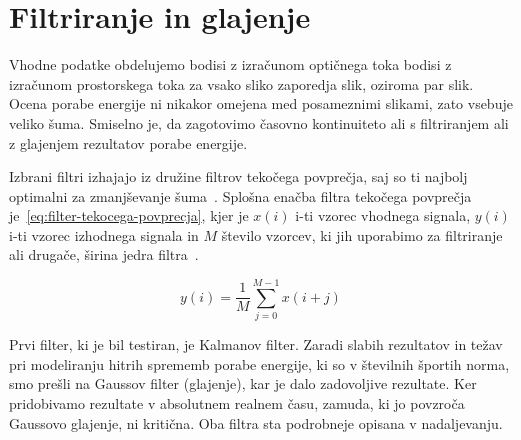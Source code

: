 \section{Filtriranje in glajenje}\label{sec:filtri}
Vhodne podatke obdelujemo bodisi z izračunom optičnega toka bodisi z izračunom prostorskega toka za vsako sliko zaporedja slik, oziroma par slik. Ocena porabe energije ni nikakor omejena med posameznimi slikami, zato vsebuje veliko šuma. Smiselno je, da zagotovimo časovno kontinuiteto ali s filtriranjem ali z glajenjem rezultatov porabe energije.

Izbrani filtri izhajajo iz družine filtrov tekočega povprečja, saj so ti najbolj optimalni za zmanjševanje šuma~\cite{smith1997scientist}. Splošna enačba filtra tekočega povprečja je~\eqref{eq:filter-tekocega-povprecja}, kjer je $x(i)$ i-ti vzorec vhodnega signala, $y(i)$ i-ti vzorec izhodnega signala in $M$ število vzorcev, ki jih uporabimo za filtriranje ali drugače, širina jedra filtra~\cite{smith1997scientist}.

\begin{equation}
y(i) = \frac{1}{M} \sum_{j=0}^{M-1} x(i + j)
\label{eq:filter-tekocega-povprecja}
\end{equation}

Prvi filter, ki je bil testiran, je Kalmanov filter. Zaradi slabih rezultatov in težav pri modeliranju hitrih sprememb porabe energije, ki so v številnih športih norma, smo prešli na Gaussov filter (glajenje), kar je dalo zadovoljive rezultate. Ker pridobivamo rezultate v absolutnem realnem času, zamuda, ki jo povzroča Gaussovo glajenje, ni kritična. Oba filtra sta podrobneje opisana v nadaljevanju.





